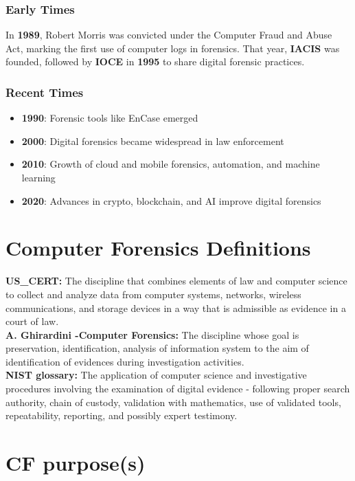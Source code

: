 \subsubsection{Early Times}
In \textbf{1989}, Robert Morris was convicted under the Computer Fraud and
Abuse Act, marking the first use of computer logs in forensics. That year,
\textbf{IACIS} was founded, followed by \textbf{IOCE} in \textbf{1995} to
share digital forensic practices.

\subsubsection{Recent Times}
\begin{itemize}
  \item \textbf{1990}: Forensic tools like EnCase emerged
  \item \textbf{2000}: Digital forensics became widespread in law enforcement
  \item \textbf{2010}: Growth of cloud and mobile forensics, automation, and
    machine learning
  \item \textbf{2020}: Advances in crypto, blockchain, and AI improve digital
    forensics
\end{itemize}

\section{Computer Forensics Definitions}

\textbf{US\_CERT:} The discipline that combines elements of law and computer
science to collect and analyze data from computer systems,
networks, wireless communications, and storage devices in a
way that is admissible as evidence in a court of law. \\
\textbf{A. Ghirardini -Computer Forensics:} The discipline whose goal is preservation, identification, analysis of
information system to the aim of identification of evidences during
investigation activities. \\
\textbf{NIST glossary:} The application of computer science and investigative procedures
involving the examination of digital evidence - following proper search
authority, chain of custody, validation with mathematics, use of validated
tools, repeatability, reporting, and possibly expert testimony.

\section{CF purpose(s)}

